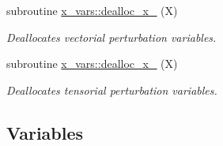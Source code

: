 \begin{DoxyCompactItemize}
subroutine \hyperlink{namespacex__vars_a20679fb70a3dbfcdf2479b1219b847d1}{x\+\_\+vars\+::dealloc\+\_\+x\+\_} (X)
\begin{DoxyCompactList}\small\item\em Deallocates vectorial perturbation variables. \end{DoxyCompactList}\item 
subroutine \hyperlink{namespacex__vars_ac052defbe764e6d02f436bd29d72db6d}{x\+\_\+vars\+::dealloc\+\_\+x\+\_} (X)
\begin{DoxyCompactList}\small\item\em Deallocates tensorial perturbation variables. \end{DoxyCompactList}\end{DoxyCompactItemize}
\subsection*{Variables}
